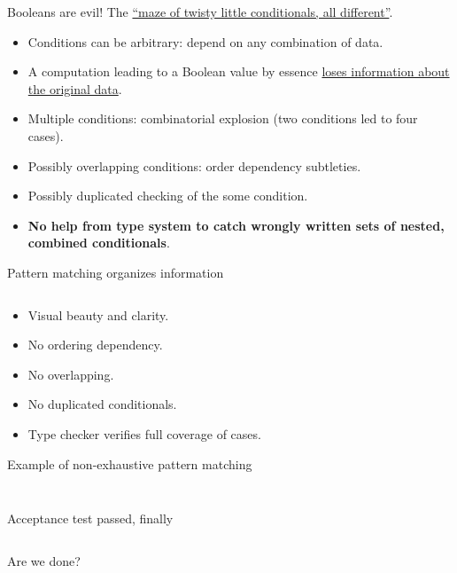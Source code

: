 \begin{frame}{Booleans are evil!}
  The \href{http://en.wikiquote.org/wiki/Colossal\_Cave\_Adventure}{``maze of twisty little conditionals, all different''}.

  \begin{itemize}
  \item Conditions can be arbitrary: depend on \alert{any} combination of data.
  \item A computation leading to a Boolean value by essence \href{http://existentialtype.wordpress.com/2011/03/15/boolean-blindness/}{loses information about the original data}.
  \item Multiple conditions: combinatorial explosion (two conditions led to four cases).
  \item Possibly overlapping conditions: order dependency subtleties.
  \item Possibly duplicated checking of the some condition.
  \item \textbf{No help from type system to catch wrongly written sets of nested, combined conditionals}.
  \end{itemize}

\end{frame}

\begin{frame}[fragile]{Pattern matching organizes information}
  \inputminted[gobble=2]{scala}{FizzBuzz2.scala}

  \begin{itemize}
  \item Visual \alert{beauty} and clarity.
  \item No ordering dependency.
  \item No overlapping.
  \item No duplicated conditionals.
  \item \alert{Type checker} verifies \alert{full coverage} of cases.
  \end{itemize}
\end{frame}

\begin{frame}[fragile]{Example of non-exhaustive pattern matching}
  \inputminted[gobble=2]{scala}{FizzBuzz2Bad.scala}

  \inputminted{console}{testQuick4.console}
\end{frame}

\begin{frame}[fragile]{Acceptance test passed, finally}

  \inputminted{console}{testQuick5.console}

  Are we done?
\end{frame}

